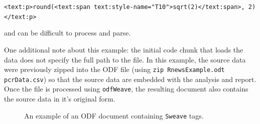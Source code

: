 \documentclass[12pt]{article}
\begin{document}
      {\center \small \verb+<text:p>round(<text:span text:style-name="T10">sqrt(2)</text:span>, 2)</text:p>+}
      
and can be difficult to process and parse.

One additional note about this example: the initial code chunk that loads the data does not specify the full path to the file. In this example, the source data were previously zipped into the ODF file (using \texttt{zip RnewsExample.odt pcrData.csv}) so that the source data are embedded with the analysis and report. Once the file is processed using \texttt{odfWeave}, the resulting document also contains the source data in it's original form. 


\begin{figure}[p]
\begin{center}
\end{center}
\caption{\label{figure:before}
An example of an ODF document containing \texttt{Sweave} tags.}
\end{figure}
\end{document}
